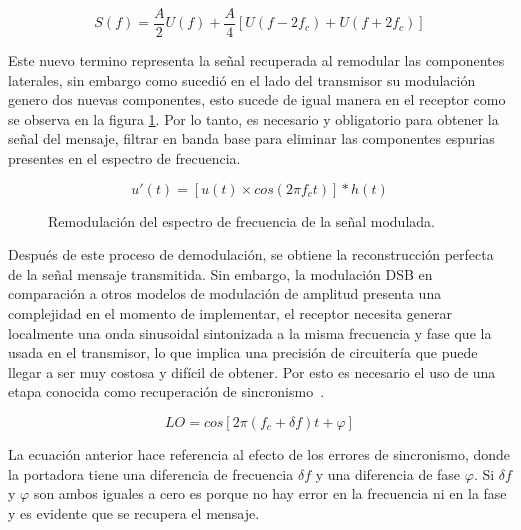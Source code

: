 \vspace{-2mm}
\begin{equation*}
	S(f)=\frac{A}{2}U(f)+\frac{A}{4}[U(f-2f_c)+U(f+2f_c)]
\end{equation*}

Este nuevo termino representa la señal recuperada al remodular las componentes laterales, sin embargo como sucedió en el lado del transmisor su modulación genero dos nuevas componentes, esto sucede de igual manera en el receptor como se observa en la figura \ref{fig:remodulacion}. Por lo tanto, es necesario y obligatorio para obtener la señal del mensaje, filtrar en banda base para eliminar las componentes espurias presentes en el espectro de frecuencia.

\vspace{-2mm}
\begin{equation*}
	u'(t)=[u(t)\times cos(2\pi f_ct)]*h(t)
\end{equation*}

\begin{figure}[h]
	\centering
	\def\svgwidth{5cm}
	\tiny{
		
	}
	\vspace{-3mm}
	\caption{\scriptsize Remodulación del espectro de frecuencia de la señal modulada.}
	\vspace{-6mm}
	\label{fig:remodulacion}
\end{figure}

Después de este proceso de demodulación, se obtiene la reconstrucción perfecta de la señal mensaje transmitida. Sin embargo, la modulación DSB en comparación a otros modelos de modulación de amplitud presenta una complejidad en el momento de implementar, el receptor necesita generar localmente una onda sinusoidal sintonizada a la misma frecuencia y fase que la usada en el transmisor, lo que implica una precisión de circuitería que puede llegar a ser muy costosa y difícil de obtener. Por esto es necesario el uso de una etapa conocida como recuperación de sincronismo~\cite{Ramirez2020}.

\vspace{-2mm}
\begin{equation*}
	LO=cos[2\pi(f_c+\delta f)t+\varphi]
\end{equation*}
\vspace{-4mm}

La ecuación anterior hace referencia al efecto de los errores de sincronismo, donde la portadora tiene una diferencia de frecuencia $\delta f$ y una diferencia de fase $\varphi$. Si $\delta f$ y $\varphi$ son ambos iguales a cero es porque no hay error en la frecuencia ni en la fase y es evidente que se recupera el mensaje.

